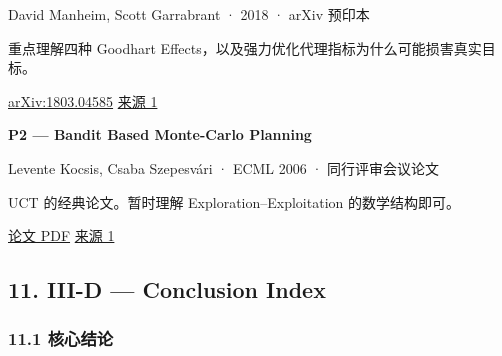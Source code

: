 David Manheim, Scott Garrabrant · 2018 · arXiv 预印本

重点理解四种 Goodhart Effects，以及强力优化代理指标为什么可能损害真实目标。

\href{https://arxiv.org/abs/1803.04585}{arXiv:1803.04585} \href{https://arxiv.org/abs/1803.04585}{来源 1}

\textbf{P2 --- Bandit Based Monte-Carlo Planning}

Levente Kocsis, Csaba Szepesvári · ECML 2006 · 同行评审会议论文

UCT 的经典论文。暂时理解 Exploration--Exploitation 的数学结构即可。

\href{https://aima.cs.berkeley.edu/~russell/classes/cs294/s11/readings/Kocsis\%2BSzepesvari\%3A2006.pdf}{论文 PDF} \href{https://cris.technion.ac.il/en/publications/bandit-based-monte-carlo-planning/}{来源 1}

\hypertarget{part-3-40-0001-iii-d-conclusion-index}{%
\subsection{11. III-D --- Conclusion Index}\label{part-3-40-0001-iii-d-conclusion-index}}

\hypertarget{part-3-40-0001-ux6838ux5fc3ux7ed3ux8bba}{%
\subsubsection{11.1 核心结论}\label{part-3-40-0001-ux6838ux5fc3ux7ed3ux8bba}}

